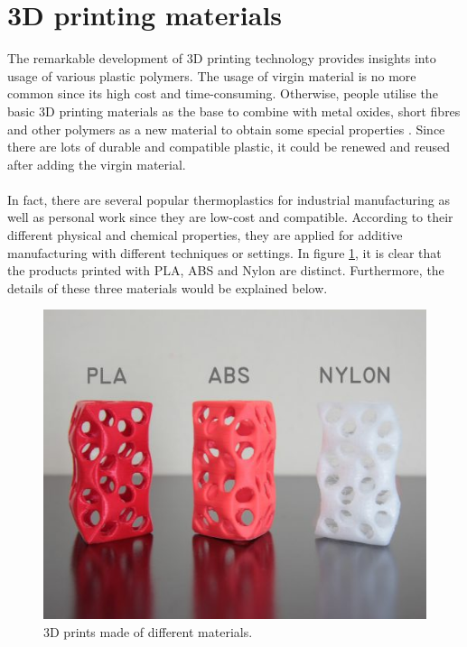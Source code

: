 \section{3D printing materials}

The remarkable development of 3D printing technology provides insights into usage of various plastic polymers. The usage of virgin material is no more common since its high cost and time-consuming. Otherwise, people utilise the basic 3D printing materials as the base to combine with metal oxides, short fibres and other polymers as a new material to obtain some special properties \cite{torrado2015characterizing}. Since there are lots of durable and compatible plastic, it could be renewed and reused after adding the virgin material. \\
 \\
In fact, there are several popular thermoplastics for industrial manufacturing as well as personal work since they are low-cost and compatible. According to their different physical and chemical properties, they are applied for additive manufacturing with different techniques or settings. In figure \ref{Fig:material-per-stampanti}, it is clear that the products printed with PLA, ABS and Nylon are distinct. Furthermore, the details of these three materials would be explained below.
\\
\begin{figure}[htbp]
  \centering
  \includegraphics[scale=0.5]{Figs//materiali-per-stampanti-3D.jpg}
  \caption[3D prints made of different materials]{\footnotesize 3D prints made of different materials.}
  \label{Fig:material-per-stampanti}
\end{figure}

